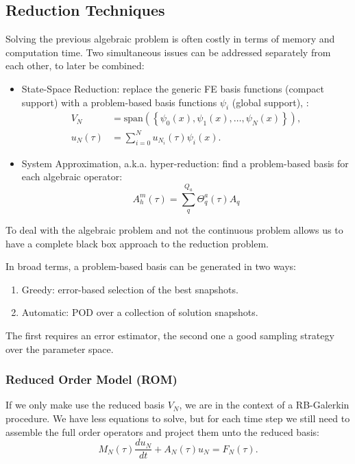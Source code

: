 \documentclass[../main.tex]{subfiles}
\begin{document}
\subsection{Reduction Techniques}
Solving the previous algebraic problem is often costly in terms of memory and computation time.
Two simultaneous issues can be addressed separately from each other, to later be combined:
\begin{itemize}
    \item State-Space Reduction: replace the generic FE basis functions (compact support) with a problem-based basis functions $\psi_i$ (global support), :
    \begin{align*}
        V_N &= \text{span}(\left\{\psi_0(x), \psi_1(x), \ldots, \psi_{N}(x)\right\}), \\
        u_N \left(\tau\right) &= \sum^{N}_{i=0} u_{N_{i}} \left(\tau\right) \psi_i (x).
    \end{align*}
    \item System Approximation, a.k.a. hyper-reduction: find a problem-based basis for each algebraic operator:
    \begin{equation*}
        A_h^m(\tau) = \sum_{q}^{Q_a} \Theta_{q}^{a}(\tau) A_q
    \end{equation*}
\end{itemize}
To deal with the algebraic problem and not the continuous problem allows us to have a complete black box approach to the reduction problem.

In broad terms, a problem-based basis can be generated in two ways:
\begin{enumerate}
    \item Greedy: error-based selection of the best snapshots.
    \item Automatic: POD over a collection of solution snapshots.
\end{enumerate}
The first requires an error estimator, the second one a good sampling strategy over the parameter space. 

\subsubsection{Reduced Order Model (ROM)}
If we only make use the reduced basis $V_N$, we are in the context of a RB-Galerkin procedure. 
We have less equations to solve, but for each time step we still need to assemble the full order operators and project them unto the reduced basis:
\begin{equation*}
    M_N (\tau) \frac{d u_N}{dt} + A_N (\tau) u_N  = F_N(\tau).
\end{equation*}
\end{document}
